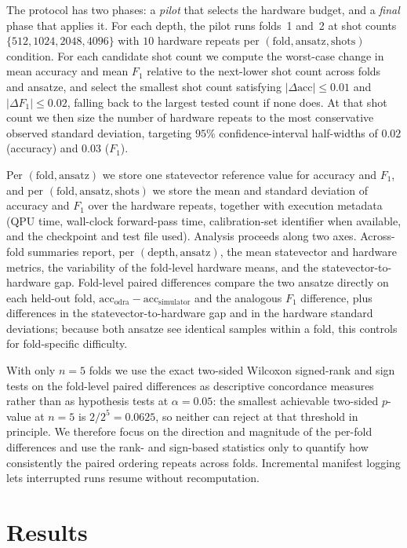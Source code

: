 \documentclass[11pt]{article}
\begin{document}
The protocol has two phases: a \emph{pilot} that selects the hardware budget, and a \emph{final} phase that applies it. For each depth, the pilot runs folds~1 and~2 at shot counts $\{512, 1024, 2048, 4096\}$ with $10$ hardware repeats per $(\text{fold}, \text{ansatz}, \text{shots})$ condition. For each candidate shot count we compute the worst-case change in mean accuracy and mean $F_1$ relative to the next-lower shot count across folds and ansatze, and select the smallest shot count satisfying $|\Delta\text{acc}| \leq 0.01$ and $|\Delta F_1| \leq 0.02$, falling back to the largest tested count if none does. At that shot count we then size the number of hardware repeats to the most conservative observed standard deviation, targeting $95\%$ confidence-interval half-widths of $0.02$ (accuracy) and $0.03$ ($F_1$). 

Per $(\text{fold}, \text{ansatz})$ we store one statevector reference value for accuracy and $F_1$, and per $(\text{fold}, \text{ansatz}, \text{shots})$ we store the mean and standard deviation of accuracy and $F_1$ over the hardware repeats, together with execution metadata (QPU time, wall-clock forward-pass time, calibration-set identifier when available, and the checkpoint and test file used). Analysis proceeds along two axes. Across-fold summaries report, per $(\text{depth}, \text{ansatz})$, the mean statevector and hardware metrics, the variability of the fold-level hardware means, and the statevector-to-hardware gap. Fold-level paired differences compare the two ansatze directly on each held-out fold, $\text{acc}_{\text{odra}} - \text{acc}_{\text{simulator}}$ and the analogous $F_1$ difference, plus differences in the statevector-to-hardware gap and in the hardware standard deviations; because both ansatze see identical samples within a fold, this controls for fold-specific difficulty.

With only $n = 5$ folds we use the exact two-sided Wilcoxon signed-rank and sign tests on the fold-level paired differences as descriptive concordance measures rather than as hypothesis tests at $\alpha = 0.05$: the smallest achievable two-sided $p$-value at $n = 5$ is $2/2^{5} = 0.0625$, so neither can reject at that threshold in principle. We therefore focus on the direction and magnitude of the per-fold differences and use the rank- and sign-based statistics only to quantify how consistently the paired ordering repeats across folds. Incremental manifest logging lets interrupted runs resume without recomputation.

\section{Results}
\end{document}
